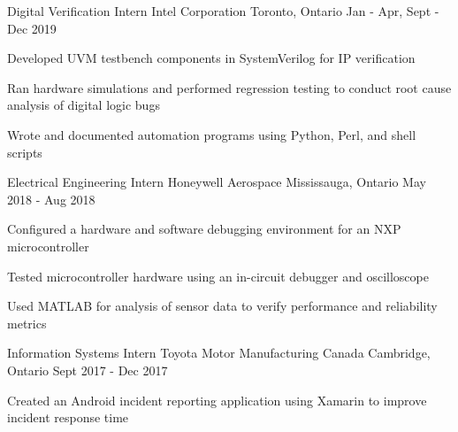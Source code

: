

\begin{cventries}

  \cventry
    {Digital Verification Intern} %
    {Intel Corporation} %
    {Toronto, Ontario} %
    {Jan - Apr, Sept - Dec 2019} %
    {
      \begin{cvitems} %
        \item {Developed UVM testbench components in SystemVerilog for IP verification}
        \item {Ran hardware simulations and performed regression testing to conduct root cause analysis of digital logic bugs}
        \item {Wrote and documented automation programs using Python, Perl, and shell scripts}
      \end{cvitems}
    }

  \cventry
    {Electrical Engineering Intern} %
    {Honeywell Aerospace} %
    {Mississauga, Ontario} %
    {May 2018 - Aug 2018} %
    {
      \begin{cvitems} %
        \item {Configured a hardware and software debugging environment for an NXP microcontroller}
        \item {Tested microcontroller hardware using an in-circuit debugger and oscilloscope}
        \item {Used MATLAB for analysis of sensor data to verify performance and reliability metrics}
      \end{cvitems}
    }

  \cventry
    {Information Systems Intern} %
    {Toyota Motor Manufacturing Canada} %
    {Cambridge, Ontario} %
    {Sept 2017 - Dec 2017} %
    {
      \begin{cvitems} %
        \item {Created an Android incident reporting application using Xamarin to improve incident response time}
      \end{cvitems}
    }


\end{cventries}
